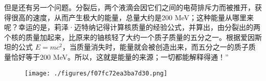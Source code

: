 但是还有另一个问题。分裂后，两个液滴会因它们之间的电荷排斥力而被推开，获得很高的速度，从而产生极大的能量，总量大约是200 MeV；这种能量从哪里来呢？幸运的是，莉泽·迈特纳记得计算核质量的经验公式，并算出，由分裂出的两个核的质量加起来，比原来的铀核轻了大约一个质子质量的五分之一。根据爱因斯坦的公式 $E = mc^2$，当质量消失时，能量就会被创造出来，而五分之一的质子质量恰好等于200 MeV。所以，这就是能量的来源；一切都能解释得通！”
\begin{figure}[ht]
\centering
\texttt{[image: ./figures/f07fc72ea3ba7d30.png]}
\caption{} \label{fig_LZm_12}
\end{figure}